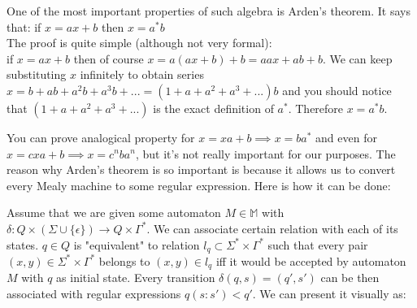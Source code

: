 \documentclass[12pt]{article}
\begin{document}
One of the most important properties of such algebra is Arden's theorem. It says that:
if $x = ax+b$ then $x=a^*b$\\
The proof is quite simple (although not very formal): \\
if $x = ax+b$ then of course $x = a(ax+b)+b = aax+ab+b$. We can keep substituting $x$ infinitely to obtain series $x = b + ab + a^2b + a^3b + ... = (1 + a + a^2 + a^3 + ...)b$ and you should notice that $(1 + a + a^2 + a^3 + ...)$ is the exact definition of $a^*$. Therefore $x=a^*b$.


You can prove analogical property for $x = xa+b \implies x=ba^*$ and even for $x = cxa+b \implies x=c^nba^n$, but it's not really important for our purposes. The reason why Arden's theorem is so important is because it allows us to convert every Mealy machine to some regular expression. Here is how it can be done:

Assume that we are given some automaton $M\in \mathbb{ M}$ with $\delta : Q \times (\Sigma \cup \{\epsilon \}) \rightarrow Q \times \Gamma^*$. We can associate certain relation with each of its states. $q \in Q$ is "equivalent" to relation $l_q \subset \Sigma^* \times \Gamma^*$ such that every pair $(x,y) \in \Sigma^* \times \Gamma^*$ belongs to $(x,y) \in l_q$ iff it would be accepted by automaton $M$ with $q$ as initial state. Every transition $  \delta(q,s) = (q',s')$ can be then associated with regular expressions $q(s:s') < q'$. We can present it visually as:
\end{document}
